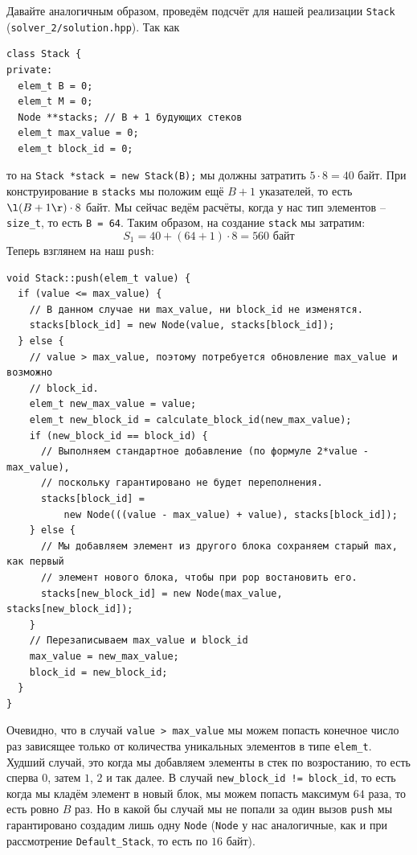 Давайте аналогичным образом, проведём подсчёт для нашей реализации \texttt{Stack} (\texttt{solver_2/solution.hpp}). Так как 
\begin{verbatim}
class Stack {
private:
  elem_t B = 0;
  elem_t M = 0;
  Node **stacks; // B + 1 будующих стеков
  elem_t max_value = 0;
  elem_t block_id = 0;
\end{verbatim}
то на \texttt{Stack *stack = new Stack(B);} мы должны затратить \(5\cdot 8 = 40\) байт. При конструирование в \texttt{stacks} мы положим ещё \(B + 1\) указателей, то есть \(\l(B + 1\r)\cdot 8\) байт. Мы сейчас ведём расчёты, когда у нас тип элементов -- \texttt{size_t}, то есть \texttt{B = 64}. 
Таким образом, на создание \texttt{stack} мы затратим:
\begin{dmath*}
  S_1 = 40 + (64+1)\cdot 8 = 560\text{ байт}
\end{dmath*} 
Теперь взглянем на наш \texttt{push}:
\begin{verbatim}
void Stack::push(elem_t value) {
  if (value <= max_value) {
    // В данном случае ни max_value, ни block_id не изменятся.
    stacks[block_id] = new Node(value, stacks[block_id]);
  } else {
    // value > max_value, поэтому потребуется обновление max_value и возможно
    // block_id.
    elem_t new_max_value = value;
    elem_t new_block_id = calculate_block_id(new_max_value);
    if (new_block_id == block_id) {
      // Выполняем стандартное добавление (по формуле 2*value - max_value),
      // поскольку гарантировано не будет переполнения.
      stacks[block_id] =
          new Node(((value - max_value) + value), stacks[block_id]);
    } else {
      // Мы добавляем элемент из другого блока сохраняем старый max, как первый
      // элемент нового блока, чтобы при pop востановить его.
      stacks[new_block_id] = new Node(max_value, stacks[new_block_id]);
    }
    // Перезаписываем max_value и block_id
    max_value = new_max_value;
    block_id = new_block_id;
  }
}
\end{verbatim}
Очевидно, что в случай \texttt{value > max_value} мы можем попасть конечное число раз зависящее только от количества уникальных элементов в типе \texttt{elem_t}. Худший случай, это когда мы добавляем элементы в стек по возростанию, то есть сперва \(0\), затем \(1\), \(2\) и так далее. В случай \texttt{new_block_id != block_id}, то есть когда мы кладём элемент в новый блок, мы можем попасть максимум \(64\) раза, то есть ровно \(B\) раз.
Но в какой бы случай мы не попали за один вызов \texttt{push} мы гарантировано создадим лишь одну \texttt{Node} (\texttt{Node} у нас аналогичные, как и при рассмотрение \texttt{Default_Stack}, то есть по \(16\) байт).


